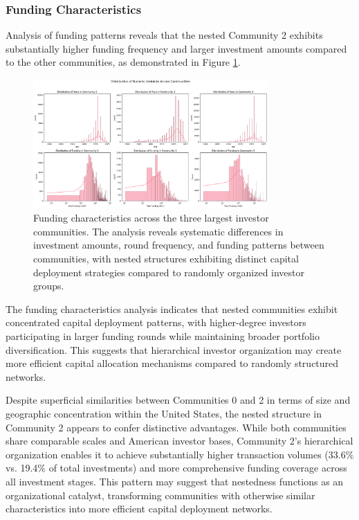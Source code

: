 \subsubsection{Funding Characteristics}

Analysis of funding patterns reveals that the nested Community 2 exhibits substantially higher funding frequency and larger investment amounts compared to the other communities, as demonstrated in Figure \ref{fig:funding_characteristics}.


\begin{figure}[htbp]
\centering
\includegraphics[width=0.8\textwidth]{./assets/funding-characteristics.png}
\caption{Funding characteristics across the three largest investor communities. The analysis reveals systematic differences in investment amounts, round frequency, and funding patterns between communities, with nested structures exhibiting distinct capital deployment strategies compared to randomly organized investor groups.}
\label{fig:funding_characteristics}
\end{figure}


The funding characteristics analysis indicates that nested communities exhibit concentrated capital deployment patterns, with higher-degree investors participating in larger funding rounds while maintaining broader portfolio diversification. This suggests that hierarchical investor organization may create more efficient capital allocation mechanisms compared to randomly structured networks.

Despite superficial similarities between Communities 0 and 2 in terms of size and geographic concentration within the United States, the nested structure in Community 2 appears to confer distinctive advantages. While both communities share comparable scales and American investor bases, Community 2's hierarchical organization enables it to achieve substantially higher transaction volumes (33.6\% vs. 19.4\% of total investments) and more comprehensive funding coverage across all investment stages. This pattern may suggest that nestedness functions as an organizational catalyst, transforming communities with otherwise similar characteristics into more efficient capital deployment networks.

